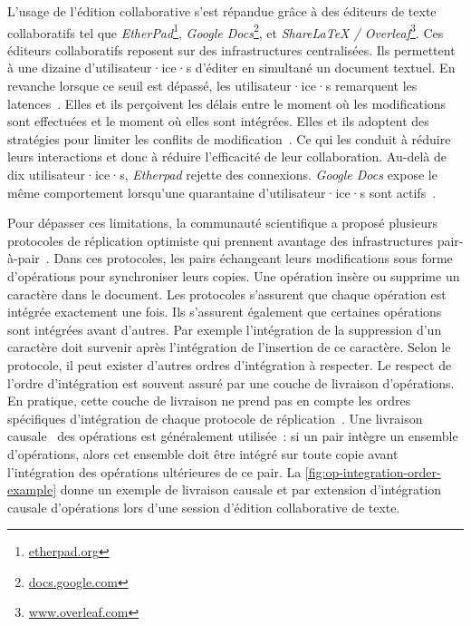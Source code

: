 L'usage de l'édition collaborative s'est répandue grâce à des éditeurs de texte collaboratifs tel que \emph{EtherPad}\footnote{\href{https://etherpad.org}{etherpad.org}}, \emph{Google Docs}\footnote{\href{https://docs.google.com}{docs.google.com}}, et \emph{ShareLaTeX / Overleaf}\footnote{\href{https://www.overleaf.com}{www.overleaf.com}}.
Ces éditeurs collaboratifs reposent sur des infrastructures centralisées.
Ils permettent à une dizaine d'utilisateur·ice·s d'éditer en simultané un document textuel.
En revanche lorsque ce seuil est dépassé, les utilisateur·ice·s remarquent les latences~\autocite{dang2016performance}.
Elles et ils perçoivent les délais entre le moment où les modifications sont effectuées et le moment où elles sont intégrées.
Elles et ils adoptent des stratégies pour limiter les conflits de modification~\autocite{ignat_2015_user-and-delay,ignat2014_delayeffect}.
Ce qui les conduit à réduire leurs interactions et donc à réduire l'efficacité de leur collaboration.
Au-delà de dix utilisateur·ice·s, \emph{Etherpad} rejette des connexions.
\emph{Google Docs} expose le même comportement lorsqu'une quarantaine d'utilisateur·ice·s sont actifs~\autocite{dang2016performance}.

Pour dépasser ces limitations, la communauté scientifique a proposé plusieurs protocoles de réplication optimiste qui prennent avantage des infrastructures pair-à-pair~\autocite{ahmednacer2011evaluatingcrdts,oster_2006_woot,preguica_2009_treedoc,weiss2010logoot,roh_2011_rga,andre_2013_logootsplit,nicolaescu2015yjs,briot_2016_rgasplit}.
Dans ces protocoles, les pairs échangeant leurs modifications sous forme d'opérations pour synchroniser leurs copies.
Une opération insère ou supprime un caractère dans le document.
Les protocoles s'assurent que chaque opération est intégrée exactement une fois.
Ils s'assurent également que certaines opérations sont intégrées avant d'autres.
Par exemple l'intégration de la suppression d'un caractère doit survenir après l'intégration de l'insertion de ce caractère.
Selon le protocole, il peut exister d'autres ordres d'intégration à respecter.
Le respect de l'ordre d'intégration est souvent assuré par une couche de livraison d'opérations.
En pratique, cette couche de livraison ne prend pas en compte les ordres spécifiques d'intégration de chaque protocole de réplication~\autocite{shapiro_2011_crdt,shapiro2011_comprehensive}.
Une livraison causale~\autocite{prakash_1997_barrierbarrier} des opérations est généralement utilisée~: si un pair intègre un ensemble d'opérations, alors cet ensemble doit être intégré sur toute copie avant l'intégration des opérations ultérieures de ce pair.
La \autoref{fig:op-integration-order-example} donne un exemple de livraison causale et par extension d'intégration causale d'opérations lors d'une session d'édition collaborative de texte.

